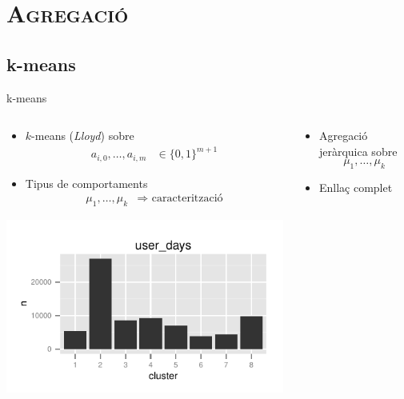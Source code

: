 \documentclass[xcolor=x11names,
								compress,
								aspectratio=1610]{beamer}
\newcommand{\mt}[1]{\texttt{#1}}
\theoremstyle{definition}%
\renewcommand{\(}{\begin{columns}}
\renewcommand{\)}{\end{columns}}
\newcommand{\<}[1]{\begin{column}{#1}}
\renewcommand{\>}{\end{column}}
\begin{document}
\section{\scshape Agregació}
\subsection{k-means}
\begin{frame}{k-means}
	\begin{columns}[onlytextwidth]
		\begin{column}{.5\textwidth}
		\begin{itemize}
  	\item $k$-means (\emph{Lloyd}) sobre 
		\begin{align*}
			a_{i,0},\ldots,a_{i,m} & \in \{0,1\}^{m+1}
		\end{align*}
		\item Tipus de comportaments
		\begin{align*}
			\mu_1,\ldots,\mu_k & \Rightarrow \text{ caracterització}
		\end{align*}
  	\end{itemize}
		\begin{center}
		\includegraphics[width=\textwidth]{user_presence_8means_clusts}
		\end{center}
		\end{column}
		\begin{column}{.5\textwidth}
		\begin{itemize}
			\item Agregació jeràrquica sobre
				$$
				 \mu_1,\ldots,\mu_k
				$$
			\item Enllaç complet
			\end{itemize}

\end{column}
\end{columns}
\end{frame}
\end{document}
